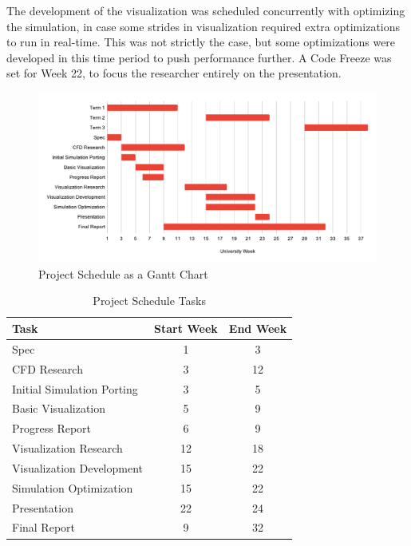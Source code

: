 The development of the visualization was scheduled concurrently with optimizing the simulation, in case some strides in visualization required extra optimizations to run in real-time.
This was not strictly the case, but some optimizations were developed in this time period to push performance further.
A Code Freeze was set for Week 22, to focus the researcher entirely on the presentation.

\begin{figure}[ht]
    \centering
    \includegraphics[width=\linewidth]{Ch50ProjectManagement/cs311_gantt_chart.svg.pdf}
    \caption{Project Schedule as a Gantt Chart}
    \label{fig:project schedule gantt}
\end{figure}

\begin{table}[ht]
    \centering
    \begin{tabular}{l|c|c}
    \textbf{Task} & \textbf{Start Week} & \textbf{End Week} \\
    \hline
    Spec & 1 & 3 \\
    CFD Research & 3 & 12 \\
    Initial Simulation Porting & 3 & 5 \\
    Basic Visualization & 5 & 9 \\
    Progress Report & 6 & 9 \\
    Visualization Research & 12 & 18 \\
    Visualization Development & 15 & 22 \\
    Simulation Optimization & 15 & 22 \\
    Presentation & 22 & 24 \\
    Final Report & 9 & 32 \\
    \end{tabular}
    \caption{Project Schedule Tasks}
    \label{tab:project schedule table}
\end{table}

